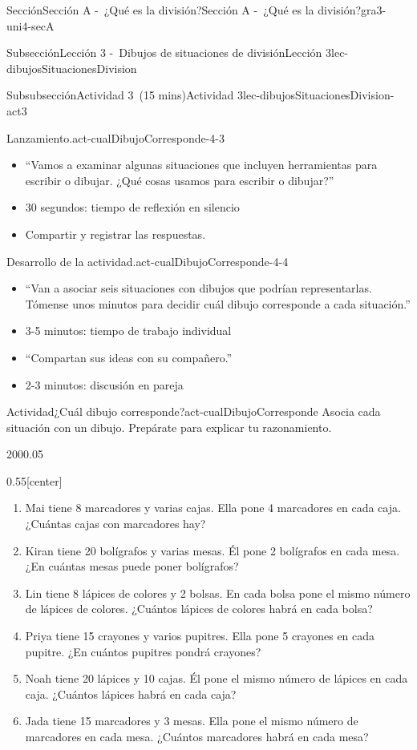 \documentclass[oneside,10pt,]{article}
\begin{document}
\begin{sectionptx}{Sección}{Sección A -~¿Qué es la división?}{}{Sección A -~¿Qué es la división?}{}{}{gra3-uni4-secA}
\begin{subsectionptx}{Subsección}{Lección 3 -~Dibujos de situaciones de división}{}{Lección 3}{}{}{lec-dibujosSituacionesDivision}
\begin{subsubsectionptx}{Subsubsección}{Actividad 3~(15 mins)}{}{Actividad 3}{}{}{lec-dibujosSituacionesDivision-act3}
\begin{paragraphs}{Lanzamiento.}{act-cualDibujoCorresponde-4-3}
\begin{itemize}[label=\textbullet]
\item{}``Vamos a examinar algunas situaciones que incluyen herramientas para escribir o dibujar. ¿Qué cosas usamos para escribir o dibujar?''%
\item{}30 segundos: tiempo de reflexión en silencio%
\item{}Compartir y registrar las respuestas.%
\end{itemize}
\end{paragraphs}%
\begin{paragraphs}{Desarrollo de la actividad.}{act-cualDibujoCorresponde-4-4}%
%
\begin{itemize}[label=\textbullet]
\item{}``Van a asociar seis situaciones con dibujos que podrían representarlas. Tómense unos minutos para decidir cuál dibujo corresponde a cada situación.''%
\item{}3-5 minutos: tiempo de trabajo individual%
\item{}``Compartan sus ideas con su compañero.''%
\item{}2-3 minutos: discusión en pareja%
\end{itemize}
\end{paragraphs}%
\begin{activity}{Actividad}{¿Cuál dibujo corresponde?}{act-cualDibujoCorresponde}%
Asocia cada situación con un dibujo. Prepárate para explicar tu razonamiento.%
\begin{sidebyside}{2}{0}{0}{0.05}%
\begin{sbspanel}{0.55}[center]%
%
\begin{enumerate}
\item{}Mai tiene 8 marcadores y varias cajas. Ella pone 4 marcadores en cada caja. ¿Cuántas cajas con marcadores hay?%
\item{}Kiran tiene 20 bolígrafos y varias mesas. Él pone 2 bolígrafos en cada mesa. ¿En cuántas mesas puede poner bolígrafos?%
\item{}Lin tiene 8 lápices de colores y 2 bolsas. En cada bolsa pone el mismo número de lápices de colores. ¿Cuántos lápices de colores habrá en cada bolsa?%
\item{}Priya tiene 15 crayones y varios pupitres. Ella pone 5 crayones en cada pupitre. ¿En cuántos pupitres pondrá crayones?%
\item{}Noah tiene 20 lápices y 10 cajas. Él pone el mismo número de lápices en cada caja. ¿Cuántos lápices habrá en cada caja?%
\item{}Jada tiene 15 marcadores y 3 mesas. Ella pone el mismo número de marcadores en cada mesa. ¿Cuántos marcadores habrá en cada mesa?%

\end{enumerate}
\end{sbspanel}
\end{sidebyside}
\end{activity}
\end{subsubsectionptx}
\end{subsectionptx}
\end{sectionptx}
\end{document}
